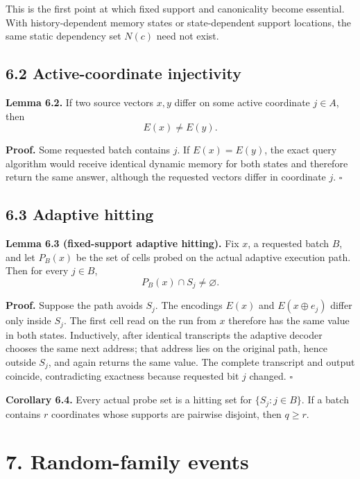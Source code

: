 \documentclass[
]{article}
\begin{document}
This is the first point at which fixed support and canonicality become
essential. With history-dependent memory states or state-dependent
support locations, the same static dependency set \(N(c)\) need not
exist.

\hypertarget{active-coordinate-injectivity}{%
\subsection{6.2 Active-coordinate
injectivity}\label{active-coordinate-injectivity}}

\textbf{Lemma 6.2.} If two source vectors \(x,y\) differ on some active
coordinate \(j\in A\), then \[
E(x)\ne E(y).
\]

\textbf{Proof.} Some requested batch contains \(j\). If \(E(x)=E(y)\),
the exact query algorithm would receive identical dynamic memory for
both states and therefore return the same answer, although the requested
vectors differ in coordinate \(j\). \(\square\)

\hypertarget{adaptive-hitting}{%
\subsection{6.3 Adaptive hitting}\label{adaptive-hitting}}

\textbf{Lemma 6.3 (fixed-support adaptive hitting).} Fix \(x\), a
requested batch \(B\), and let \(P_B(x)\) be the set of cells probed on
the actual adaptive execution path. Then for every \(j\in B\), \[
P_B(x)\cap S_j\ne\varnothing.
\]

\textbf{Proof.} Suppose the path avoids \(S_j\). The encodings \(E(x)\)
and \(E(x\oplus e_j)\) differ only inside \(S_j\). The first cell read
on the run from \(x\) therefore has the same value in both states.
Inductively, after identical transcripts the adaptive decoder chooses
the same next address; that address lies on the original path, hence
outside \(S_j\), and again returns the same value. The complete
transcript and output coincide, contradicting exactness because
requested bit \(j\) changed. \(\square\)

\textbf{Corollary 6.4.} Every actual probe set is a hitting set for
\(\{S_j:j\in B\}\). If a batch contains \(r\) coordinates whose supports
are pairwise disjoint, then \(q\ge r\).

\hypertarget{random-family-events}{%
\section{7. Random-family events}\label{random-family-events}}
\end{document}
